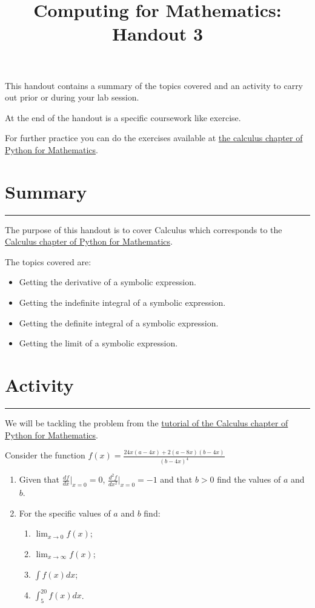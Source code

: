 \documentclass{article}
\title{Computing for Mathematics: Handout 3}
\date{}
\begin{document}
\maketitle


This handout contains a summary of the topics covered and an activity to
carry out prior or during your lab session.

At the end of the handout is a specific coursework like exercise.

For further practice you can do the exercises available at 
\href{https://vknight.org/pfm/tools-for-mathematics/03-calculus/exercises/main.html}{the
calculus chapter of Python for Mathematics}.

\section{Summary}\label{summary}
\hrule


The purpose of this handout is to cover Calculus which
corresponds to the
\href{https://vknight.org/pfm/tools-for-mathematics/03-calculus/introduction/main.html}{Calculus
chapter of Python for Mathematics}.

The topics covered are:

\begin{itemize}
\item
  Getting the derivative of a symbolic expression.
\item
  Getting the indefinite integral of a symbolic expression.
\item
  Getting the definite integral of a symbolic expression.
\item
  Getting the limit of a symbolic expression.
\end{itemize}


\section{Activity}\label{activity}
\hrule

We will be tackling the problem from the
\href{https://vknight.org/pfm/tools-for-mathematics/03-calculus/tutorial/}{tutorial
of the Calculus chapter of Python for Mathematics}.

Consider the function $f(x)= \frac{24 x \left(a - 4 x\right) + 2 \left(a - 8 x\right) \left(b - 4 x\right)}{\left(b - 4 x\right)^{4}}$

\begin{enumerate}
    \item Given that $\frac{df}{dx}|_{x=0}=0$, $\frac{d^2f}{dx^2}|_{x=0}=-1$ and
    that $b>0$ find the values of $a$ and $b$.
    \item For the specific values of $a$ and $b$ find:
        \begin{enumerate}
            \item $\lim_{x\to 0}f(x)$;
            \item $\lim_{x\to \infty}f(x)$;
            \item $\int f(x) dx$;
            \item $\int_{5}^{20} f(x) dx$.
        \end{enumerate}
\end{enumerate}
\end{document}
